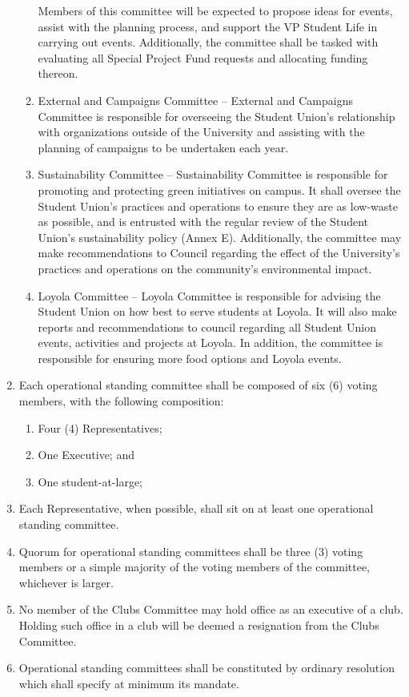 \documentclass[oneside]{book}
\begin{document}
\begin{enumerate}
\begin{enumerate}
Members of this committee will be expected to propose ideas for events, assist 
with the planning process, and support the VP Student Life in carrying out events. 
Additionally, the committee shall be tasked with evaluating all Special Project Fund
requests and allocating funding thereon.
\item External and Campaigns Committee -- External and Campaigns Committee
is responsible for overseeing the Student Union's relationship with
organizations outside of the University and assisting with the planning
of campaigns to be undertaken each year. 
\item Sustainability Committee -- Sustainability Committee is responsible
for promoting and protecting green initiatives on campus. It shall oversee 
the Student Union's practices and operations to ensure they are as low-waste 
as possible, and is entrusted with the regular review of the Student Union's 
sustainability policy (Annex E). Additionally, the committee may make 
recommendations to Council regarding the effect of the University’s practices 
and operations on the community's environmental impact.
\item Loyola Committee -- Loyola Committee is responsible for advising
the Student Union on how best to serve students at Loyola. It will also make
reports and recommendations to council regarding all Student Union events, activities
and projects at Loyola. In addition, the committee is responsible
for ensuring more food options and Loyola events. 
\end{enumerate}
\item Each operational standing committee
shall be composed of six (6) voting members, with the following composition:

\begin{enumerate}
\item Four (4) Representatives;
\item One Executive; and
\item One student-at-large;
\end{enumerate}

\item Each Representative, when possible, shall sit on at least one operational standing
committee. 
\item Quorum for operational standing committees shall be three (3) voting members or a simple majority 
of the voting members of the committee, whichever is larger. 
\item No member of the Clubs Committee may hold office as an executive 
of a club. Holding such office in a club will be deemed a resignation from the 
Clubs Committee. 
\item Operational standing committees shall be constituted by ordinary resolution which shall specify at minimum its mandate.


\end{enumerate}
\end{document}
